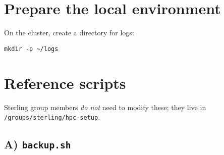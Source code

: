 \documentclass[12pt,letterpaper]{article}
\begin{document}
\section{Prepare the local environment}
\label{sec:prepare}
On the cluster, create a directory for logs:
\begin{lstlisting}[style=custombash]
mkdir -p ~/logs
\end{lstlisting}

\section{Reference scripts}
\label{sec:reference-scripts}
Sterling group members \emph{do not} need to modify these; they live in
\verb|/groups/sterling/hpc-setup|.

\subsection{A) \texttt{backup.sh}}
\end{document}
